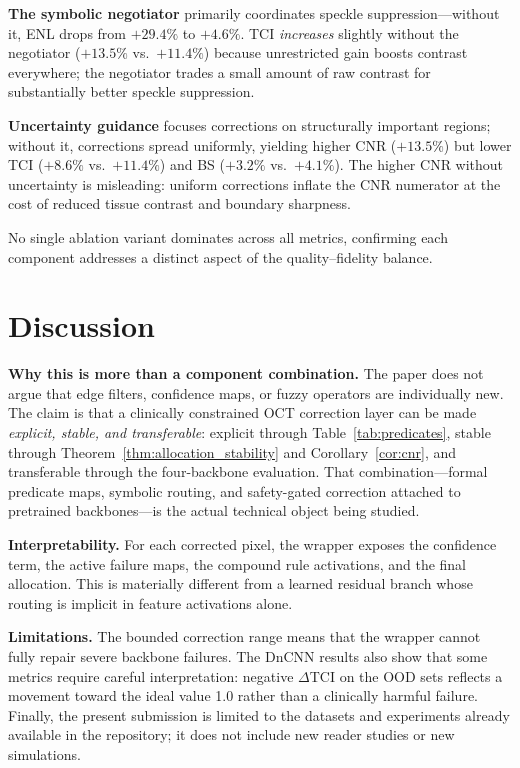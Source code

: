 \documentclass{ieeetj}
\begin{document}
\textbf{The symbolic negotiator} primarily coordinates speckle suppression---without it, ENL drops from $+29.4\%$ to $+4.6\%$. TCI \emph{increases} slightly without the negotiator ($+13.5\%$ vs.\ $+11.4\%$) because unrestricted gain boosts contrast everywhere; the negotiator trades a small amount of raw contrast for substantially better speckle suppression.

\textbf{Uncertainty guidance} focuses corrections on structurally important regions; without it, corrections spread uniformly, yielding higher CNR ($+13.5\%$) but lower TCI ($+8.6\%$ vs.\ $+11.4\%$) and BS ($+3.2\%$ vs.\ $+4.1\%$). The higher CNR without uncertainty is misleading: uniform corrections inflate the CNR numerator at the cost of reduced tissue contrast and boundary sharpness.

No single ablation variant dominates across all metrics, confirming each component addresses a distinct aspect of the quality--fidelity balance.

\section{Discussion}
\label{sec:discussion}

\textbf{Why this is more than a component combination.}
The paper does not argue that edge filters, confidence maps, or fuzzy operators are individually new. The claim is that a clinically constrained OCT correction layer can be made \emph{explicit, stable, and transferable}: explicit through Table~\ref{tab:predicates}, stable through Theorem~\ref{thm:allocation_stability} and Corollary~\ref{cor:cnr}, and transferable through the four-backbone evaluation. That combination---formal predicate maps, symbolic routing, and safety-gated correction attached to pretrained backbones---is the actual technical object being studied.

\textbf{Interpretability.}
For each corrected pixel, the wrapper exposes the confidence term, the active failure maps, the compound rule activations, and the final allocation. This is materially different from a learned residual branch whose routing is implicit in feature activations alone.

\textbf{Limitations.}
The bounded correction range means that the wrapper cannot fully repair severe backbone failures. The DnCNN results also show that some metrics require careful interpretation: negative $\Delta$TCI on the OOD sets reflects a movement toward the ideal value 1.0 rather than a clinically harmful failure. Finally, the present submission is limited to the datasets and experiments already available in the repository; it does not include new reader studies or new simulations.
\end{document}
